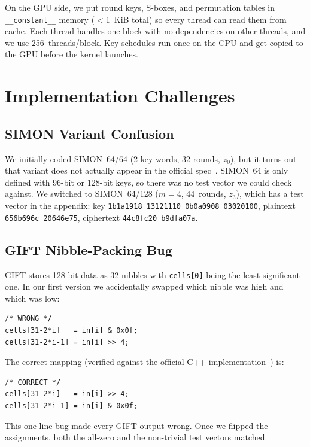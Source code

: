 \documentclass[conference]{IEEEtran}
\begin{document}
On the GPU side, we put round keys, S-boxes, and permutation tables in
\texttt{\_\_constant\_\_} memory ($<$1~KiB total) so every thread can
read them from cache.  Each thread handles one block with no
dependencies on other threads, and we use 256~threads/block.  Key
schedules run once on the CPU and get copied to the GPU before the
kernel launches.

\section{Implementation Challenges}\label{sec:challenges}

\subsection{SIMON Variant Confusion}

We initially coded SIMON~64/64 (2 key words, 32 rounds, $z_0$), but
it turns out that variant does not actually appear in the official
spec~\cite{beaulieu2013simon}.  SIMON~64 is only defined with 96-bit
or 128-bit keys, so there was no test vector we could check against.
We switched to SIMON~64/128 ($m{=}4$, 44~rounds, $z_3$), which has a
test vector in the appendix: key
\texttt{1b1a1918\,13121110\,0b0a0908\,03020100}, plaintext
\texttt{656b696c\,20646e75}, ciphertext
\texttt{44c8fc20\,b9dfa07a}.

\subsection{GIFT Nibble-Packing Bug}

GIFT stores 128-bit data as 32 nibbles with \texttt{cells[0]} being the
least-significant one.  In our first version we accidentally swapped
which nibble was high and which was low:
\begin{lstlisting}
/* WRONG */
cells[31-2*i]   = in[i] & 0x0f;
cells[31-2*i-1] = in[i] >> 4;
\end{lstlisting}
The correct mapping (verified against the official C++
implementation~\cite{giftref}) is:
\begin{lstlisting}
/* CORRECT */
cells[31-2*i]   = in[i] >> 4;
cells[31-2*i-1] = in[i] & 0x0f;
\end{lstlisting}
This one-line bug made every GIFT output wrong.  Once we flipped the
assignments, both the all-zero and the non-trivial test vectors matched.
\end{document}
